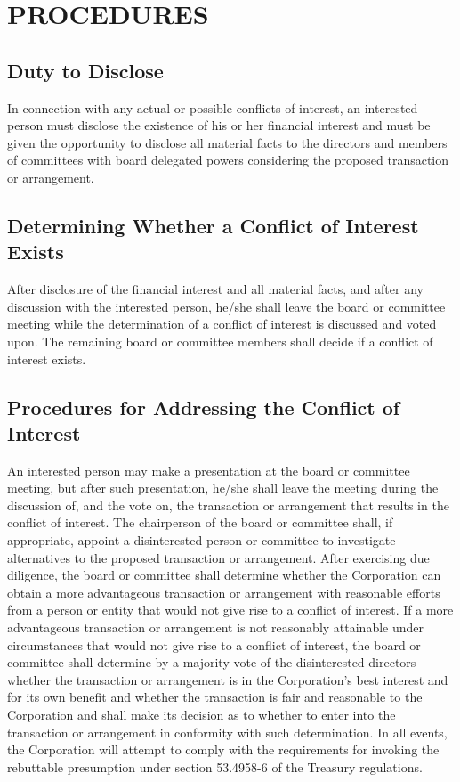 \documentclass{article}
\begin{document}
\section{PROCEDURES}
\subsection{Duty to Disclose}
In connection with any actual or possible conflicts of interest, an interested person must disclose the existence of his or her financial interest and must be given the opportunity to disclose all material facts to the directors and members of committees with board delegated powers considering the proposed transaction or arrangement.  
\subsection{Determining Whether a Conflict of Interest Exists}
After disclosure of the financial interest and all material facts, and after any discussion with the interested person, he/she shall leave the board or committee meeting while the determination of a conflict of interest is discussed and voted upon. The remaining board or committee members shall decide if a conflict of interest exists.
\subsection{Procedures for Addressing the Conflict of Interest}
An interested person may make a presentation at the board or committee meeting, but after such presentation, he/she shall leave the meeting during the discussion of, and the vote on, the transaction or arrangement that results in the conflict of interest.
The chairperson of the board or committee shall, if appropriate, appoint a disinterested person or committee to investigate alternatives to the proposed transaction or arrangement.
After exercising due diligence, the board or committee shall determine whether the Corporation can obtain a more advantageous transaction or arrangement with reasonable efforts from a person or entity that would not give rise to a conflict of interest.
If a more advantageous transaction or arrangement is not reasonably attainable under circumstances that would not give rise to a conflict of interest, the board or committee shall determine by a majority vote of the disinterested directors whether the transaction or arrangement is in the Corporation’s best interest and for its own benefit and whether the transaction is fair and reasonable to the Corporation and shall make its decision as to whether to enter into the transaction or arrangement in conformity with such determination.
In all events, the Corporation will attempt to comply with the requirements for invoking the rebuttable presumption under section 53.4958-6 of the Treasury regulations.
\end{document}
